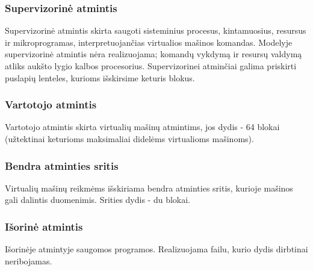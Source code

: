 \documentclass{scrartcl}
\begin{document}
            \subsubsection{Supervizorinė atmintis}
                Supervizorinė atmintis skirta saugoti sisteminius procesus, kintamuosius, resursus ir mikroprogramas, interpretuojančias virtualios mašinos komandas. Modelyje supervizorinė atmintis nėra realizuojama; komandų vykdymą ir resursų valdymą atliks aukšto lygio kalbos procesorius. Supervizorinei atminčiai galima priskirti puslapių lenteles, kurioms išskirsime keturis blokus.
            \subsubsection{Vartotojo atmintis}
                Vartotojo atmintis skirta virtualių mašinų atmintims, jos dydis - 64 blokai (užtektinai keturioms maksimaliai didelėms virtualioms mašinoms).
            \subsubsection{Bendra atminties sritis}
                Virtualių mašinų reikmėms išskiriama bendra atminties sritis, kurioje mašinos gali dalintis duomenimis. Srities dydis - du blokai.
            \subsubsection{Išorinė atmintis}
                Išorinėje atmintyje saugomos programos. Realizuojama failu, kurio dydis dirbtinai neribojamas.
\end{document}
